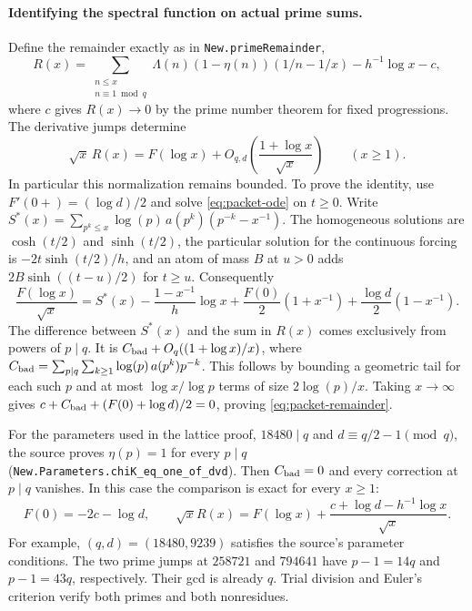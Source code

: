 \paragraph{Identifying the spectral function on actual prime sums.}
Define the remainder exactly as in \texttt{New.primeRemainder},
\[
 R(x)=
 \sum_{\substack{n\le x\\n\equiv1\bmod q}}
 \Lambda(n)(1-\eta(n))(1/n-1/x)-h^{-1}\log x-c,
\]
where $c$ gives $R(x)\to0$ by the prime number theorem for fixed progressions.
The derivative jumps determine
\begin{equation}
 \sqrt{x}\,R(x)=F(\log x)+O_{q,d}\!\left(\frac{1+\log x}{\sqrt{x}}\right)
 \qquad(x\ge 1).
 \label{eq:packet-remainder}
\end{equation}
In particular this normalization remains bounded. To prove the identity, use
$F'(0+)=(\log d)/2$ and solve \eqref{eq:packet-ode} on $t\ge0$. Write
$S^*(x)=\sum_{p^k\le x}\log(p)\,a(p^k)(p^{-k}-x^{-1})$. The homogeneous
solutions are $\cosh(t/2)$ and $\sinh(t/2)$, the particular solution for
the continuous forcing is $-2t\sinh(t/2)/h$, and an atom of mass $B$
at $u>0$ adds $2B\sinh((t-u)/2)$ for $t\ge u$. Consequently
\[
 \frac{F(\log x)}{\sqrt{x}}=
 S^*(x)-\frac{1-x^{-1}}h\log x+
 \frac{F(0)}2(1+x^{-1})+\frac{\log d}2(1-x^{-1}).
\]
The difference between $S^*(x)$ and the sum in $R(x)$ comes exclusively from
powers of $p\mid q$. It is
$C_{\rm bad}+O_q((1+\log x)/x)$, where
$C_{\rm bad}=\sum_{p\mid q}\sum_{k\ge1}\log(p)\,a(p^k)p^{-k}$.
This follows by bounding a geometric tail for each such $p$ and at most
$\log x/\log p$ terms of size $2\log(p)/x$. Taking $x\to\infty$ gives
$c+C_{\rm bad}+(F(0)+\log d)/2=0$, proving \eqref{eq:packet-remainder}.

For the parameters used in the lattice proof, $18480\mid q$ and
$d\equiv q/2-1\pmod q$, the source proves $\eta(p)=1$ for every $p\mid q$
(\texttt{New.Parameters.chiK\_eq\_one\_of\_dvd}). Then $C_{\rm bad}=0$
and every correction at $p\mid q$ vanishes. In this case the comparison
is exact for every $x\ge1$:
\[
 F(0)=-2c-\log d,\qquad
 \sqrt{x}R(x)=F(\log x)+\frac{c+\log d-h^{-1}\log x}{\sqrt{x}} .
\]
For example, $(q,d)=(18480,9239)$ satisfies the source's parameter conditions.
The two prime jumps at $258721$ and $794641$ have
$p-1=14q$ and $p-1=43q$, respectively. Their gcd is already $q$.
Trial division and Euler's criterion verify both primes and both nonresidues.

